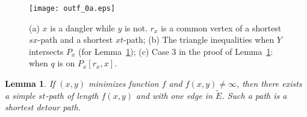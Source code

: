 \documentclass[review]{elsarticle}
\newtheorem{lem}[thm]{Lemma}
\begin{document}
\begin{figure}[t]
\begin{center}
\texttt{[image: outf\_0a.eps]}
\caption{{\rm (a)} $x$ is a dangler while $y$ is not. $r_x$ is a common
vertex of a shortest $sx$-path and a shortest $xt$-path; {\rm (b)} The
triangle inequalities when $Y$ intersects $P_x$ (for
Lemma~\ref{outopt}); {\rm (c)} Case 3 in the proof of {\rm Lemma~\ref{outopt}}:
when $q$ is on $P_x[r_x,x]$.  } \label{outf}
\end{center}
\vspace{10pt}
\end{figure}


\begin{lem}\label{outopt}
If $(x,y)$ minimizes function $f$ and $f(x,y)\neq \infty$, then
there exists a simple $st$-path of length $f(x,y)$ and with one edge
in $\widetilde{E}$. Such a path is a shortest detour path.
\end{lem}
\end{document}
